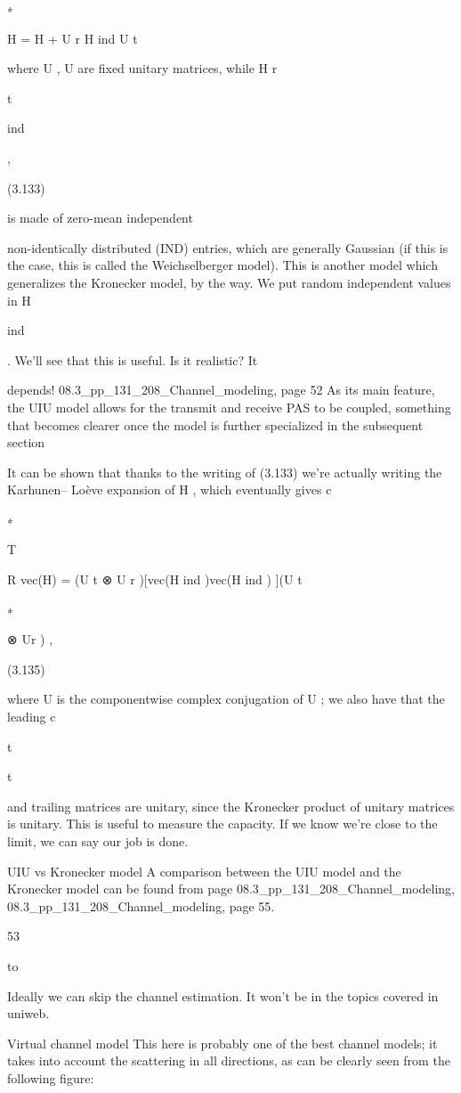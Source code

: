 {{{{∗

H = \mu H + U r H ind U t

where U , U are fixed unitary matrices, while H r

t

ind

,

(3.133)

is made of zero-mean independent

non-identically distributed (IND) entries, which are generally Gaussian (if this is the case, this is called the Weichselberger model). This is another model which generalizes the Kronecker model, by the way.
We put random independent values in H

ind

. We'll see that this is useful. Is it realistic? It

depends!
08.3_pp_131_208_Channel_modeling, page 52 As its main feature, the UIU model allows for the transmit and receive PAS to be coupled, something that becomes clearer once the model is further specialized in the subsequent section

It can be shown that thanks to the writing of (3.133) we're actually writing the Karhunen–
Loève expansion of H , which eventually gives c

∗

T

R vec(H) = (U t ⊗ U r )[vec(H ind )vec(H ind ) ](U t

∗

⊗ Ur ) ,

(3.135)

where U is the componentwise complex conjugation of U ; we also have that the leading c

t

t

and trailing matrices are unitary, since the Kronecker product of unitary matrices is unitary.
This is useful to measure the capacity. If we know we're close to the limit, we can say our job is done.

UIU vs Kronecker model A comparison between the UIU model and the Kronecker model can be found from page 08.3_pp_131_208_Channel_modeling,
08.3_pp_131_208_Channel_modeling, page 55.

53

to

Ideally we can skip the channel estimation. It won't be in the topics covered in uniweb.

Virtual channel model This here is probably one of the best channel models; it takes into account the scattering in all directions, as can be clearly seen from the following figure:

}}}}
